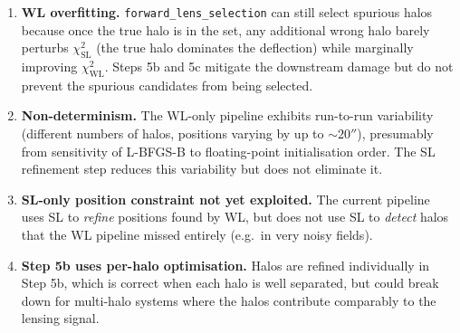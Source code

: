 \documentclass[12pt]{article}
\begin{document}
\begin{enumerate}
  \item \textbf{WL overfitting.}  \texttt{forward\_lens\_selection} can still select
        spurious halos because once the true halo is in the set, any additional wrong halo
        barely perturbs $\chi^2_\mathrm{SL}$ (the true halo dominates the deflection) while
        marginally improving $\chi^2_\mathrm{WL}$.  Steps 5b and 5c mitigate the downstream
        damage but do not prevent the spurious candidates from being selected.

  \item \textbf{Non-determinism.}  The WL-only pipeline exhibits run-to-run variability
        (different numbers of halos, positions varying by up to $\sim 20''$), presumably
        from sensitivity of L-BFGS-B to floating-point initialisation order.  The SL
        refinement step reduces this variability but does not eliminate it.

  \item \textbf{SL-only position constraint not yet exploited.}  The current pipeline uses
        SL to \emph{refine} positions found by WL, but does not use SL to \emph{detect}
        halos that the WL pipeline missed entirely (e.g.\ in very noisy fields).

  \item \textbf{Step 5b uses per-halo optimisation.}  Halos are refined individually in
        Step 5b, which is correct when each halo is well separated, but could break down
        for multi-halo systems where the halos contribute comparably to the lensing signal.
\end{enumerate}
\end{document}
